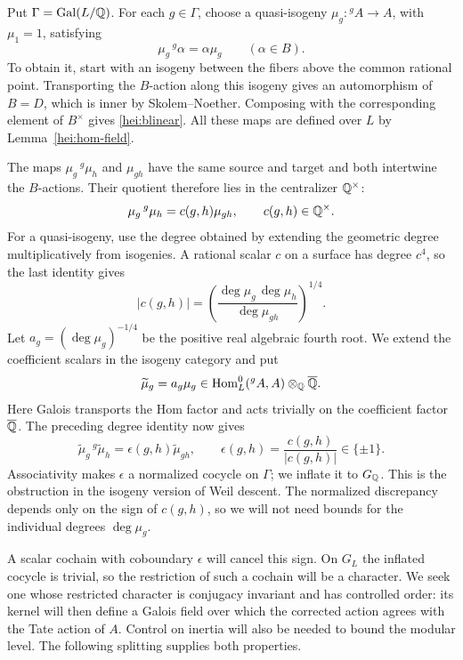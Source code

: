 Put $\Gamma=\operatorname{Gal}(L/\mathbb Q)$.  For each $g\in\Gamma$, choose
a quasi-isogeny $\mu_g:{}^gA\to A$, with $\mu_1=1$, satisfying
\begin{equation}\label{hei:blinear}
             \mu_g\,{}^g\alpha=\alpha\mu_g\qquad(\alpha\in B).
\end{equation}
To obtain it, start with an isogeny between the fibers above the
common rational point.  Transporting the $B$-action along this
isogeny gives an automorphism of $B=D$, which is inner by
Skolem--Noether.  Composing with the corresponding element of
$B^\times$ gives \eqref{hei:blinear}.  All these maps are defined
over $L$ by Lemma~\ref{hei:hom-field}.

The maps $\mu_g\,{}^g\mu_h$ and $\mu_{gh}$ have the same source and
target and both intertwine the $B$-actions.  Their quotient therefore
lies in the centralizer $\mathbb Q^\times$:
\[
                 \mu_g\,{}^g\mu_h=c(g,h)\mu_{gh},
                 \qquad c(g,h)\in\mathbb Q^\times.
\]
For a quasi-isogeny, use the degree obtained by extending the
geometric degree multiplicatively from isogenies.  A rational scalar
$c$ on a surface has degree $c^4$, so the last identity gives
\[
 |c(g,h)|=
 \left(\frac{\deg\mu_g\,\deg\mu_h}{\deg\mu_{gh}}\right)^{1/4}.
\]
Let $a_g=(\deg\mu_g)^{-1/4}$ be the positive real algebraic fourth
root.  We extend the coefficient scalars in the isogeny category and
put
\[
 \widetilde\mu_g=a_g\mu_g
 \in\operatorname{Hom}_L^0({}^gA,A)\otimes_\mathbb Q\overline{\mathbb Q}.
\]
Here Galois transports the Hom factor and acts trivially on the
coefficient factor $\overline{\mathbb Q}$.  The preceding degree identity
now gives
\begin{equation}\label{hei:sign-cocycle}
       \widetilde\mu_g\,{}^g\widetilde\mu_h
              =\epsilon(g,h)\widetilde\mu_{gh},
       \qquad
       \epsilon(g,h)=\frac{c(g,h)}{|c(g,h)|}\in\{\pm1\}.
\end{equation}
Associativity makes $\epsilon$ a normalized cocycle on $\Gamma$;
we inflate it to $G_\mathbb Q$.  This is the obstruction in the isogeny
version of Weil descent.  The normalized discrepancy depends only on
the sign of $c(g,h)$, so we will not need bounds for the individual
degrees $\deg\mu_g$.

A scalar cochain with coboundary $\epsilon$ will cancel this sign.
On $G_L$ the inflated cocycle is trivial, so the restriction of such
a cochain will be a character.  We seek one whose restricted character
is conjugacy invariant and has controlled order: its kernel will then
define a Galois field over which the corrected action agrees with the
Tate action of $A$.  Control on inertia will also be needed to bound
the modular level.  The following splitting supplies both properties.

